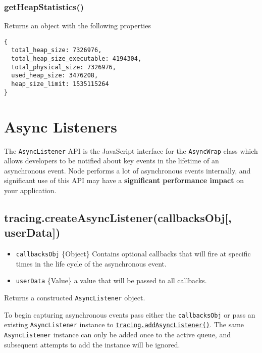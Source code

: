 \subsubsection{getHeapStatistics()}\label{getheapstatistics}

Returns an object with the following properties

\begin{verbatim}
{
  total_heap_size: 7326976,
  total_heap_size_executable: 4194304,
  total_physical_size: 7326976,
  used_heap_size: 3476208,
  heap_size_limit: 1535115264
}
\end{verbatim}

\section{Async Listeners}\label{async-listeners}

The \texttt{AsyncListener} API is the JavaScript interface for the
\texttt{AsyncWrap} class which allows developers to be notified about
key events in the lifetime of an asynchronous event. Node performs a lot
of asynchronous events internally, and significant use of this API may
have a \textbf{significant performance impact} on your application.

\subsection{tracing.createAsyncListener(callbacksObj{[},
userData{]})}\label{tracing.createasynclistenercallbacksobj-userdata}

\begin{itemize}
\itemsep1pt\parskip0pt
\item
  \texttt{callbacksObj} \{Object\} Contains optional callbacks that will
  fire at specific times in the life cycle of the asynchronous event.
\item
  \texttt{userData} \{Value\} a value that will be passed to all
  callbacks.
\end{itemize}

Returns a constructed \texttt{AsyncListener} object.

To begin capturing asynchronous events pass either the
\texttt{callbacksObj} or pass an existing \texttt{AsyncListener}
instance to
\hyperref[tracingux5ftracingux5faddasynclistenerux5fasynclistener]{\texttt{tracing.addAsyncListener()}}.
The same \texttt{AsyncListener} instance can only be added once to the
active queue, and subsequent attempts to add the instance will be
ignored.

